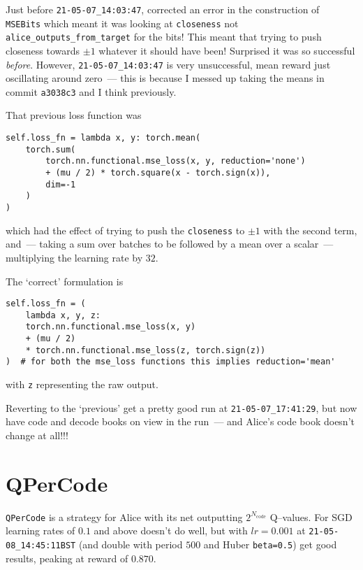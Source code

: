\documentclass[12pt]{article}
\begin{document}
Just before \verb|21-05-07_14:03:47|, corrected an error in the construction of \texttt{MSEBits} which meant it was looking at \verb|closeness| not \verb|alice_outputs_from_target| for the bits!  This meant that trying to push closeness towards $\pm 1$ whatever it should have been!  Surprised it was so successful {\em before}.  However,  \verb|21-05-07_14:03:47| is very unsuccessful, mean reward just oscillating around zero~--- this is because I messed up taking the means in commit \verb|a3038c3| and I think previously.

That previous loss function was
\begin{lstlisting}
self.loss_fn = lambda x, y: torch.mean(
	torch.sum(
		torch.nn.functional.mse_loss(x, y, reduction='none')
		+ (mu / 2) * torch.square(x - torch.sign(x)),
		dim=-1
	)
)
\end{lstlisting}
which had the effect of trying to push the \verb|closeness| to $\pm 1$ with the second term, and~--- taking a sum over batches to be followed by a mean over a scalar~--- multiplying the learning rate by $32.$

The `correct' formulation is
\begin{lstlisting}
self.loss_fn = (
	lambda x, y, z:
	torch.nn.functional.mse_loss(x, y)
	+ (mu / 2)
	* torch.nn.functional.mse_loss(z, torch.sign(z))
)  # for both the mse_loss functions this implies reduction='mean'
\end{lstlisting}
with \verb|z| representing the raw output.

Reverting to the `previous' get a pretty good run at \verb|21-05-07_17:41:29|, but now have code and decode books on view in the run~--- and Alice's code book doesn't change at all!!!


\section{QPerCode}

\verb|QPerCode| is a strategy for Alice with its net outputting $2^{N_\text{code}}$ Q--values.  For SGD learning rates of $0.1$ and above doesn't do well, but with $lr=0.001$ at \verb|21-05-08_14:45:11BST| (and double with period $500$ and Huber \verb|beta=0.5|) get good results, peaking at reward of $0.870.$
\end{document}

